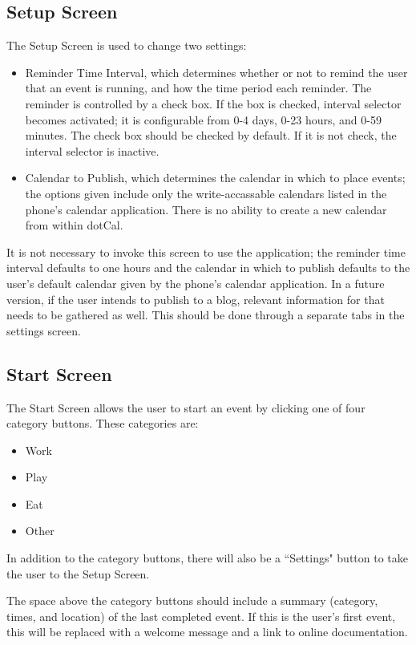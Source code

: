 \documentclass[11pt]{article}
\begin{document}
\subsection{Setup Screen} 

The Setup Screen is used to change two settings:

\begin{itemize}
	\item{Reminder Time Interval, which determines whether or not to remind the user that an event is running, and how the time period each reminder. The reminder is controlled by a check box. If the box is checked, interval selector becomes activated; it is configurable from 0-4 days, 0-23 hours, and 0-59 minutes. The check box should be checked by default. If it is not check, the interval selector is inactive.}
	\item{Calendar to Publish, which determines the calendar in which to place events; the options given include only the write-accassable calendars listed in the phone's calendar application. There is no ability to create a new calendar from within dotCal.}
\end{itemize}

It is not necessary to invoke this screen to use the application; the reminder time interval defaults to one hours and the calendar in which to publish defaults to the user's default calendar given by the phone's calendar application. In a future version, if the user intends to publish to a blog, relevant information for that needs to be gathered as well. This should be done through a separate tabs in the settings screen. 


\subsection{Start Screen}

The Start Screen allows the user to start an event by clicking one of four category buttons. These categories are:

\begin{itemize}
	\item{Work} 
	\item{Play}
	\item{Eat}
	\item{Other}
\end{itemize}

In addition to the category buttons, there will also be a ``Settings" button to take the user to the Setup Screen.

The space above the category buttons should include a summary (category, times, and location) of the last completed event. If this is the user's first event, this will be replaced with a welcome message and a link to online documentation.
\end{document}
